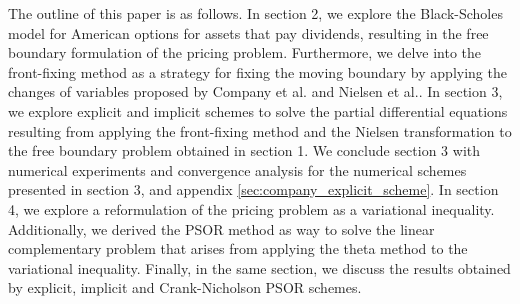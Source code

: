 The outline of this paper is as follows. In section 2, we explore the Black-Scholes model for American options for assets that pay dividends, resulting in the free boundary formulation of the pricing problem. Furthermore, we delve into the front-fixing method as a strategy for fixing the moving boundary by applying the changes of variables proposed by Company et al.\cite{company_egorova_jodar_2014} and Nielsen et al.\cite{nielsen_2001}. In section 3, we explore explicit and implicit schemes to solve the partial differential equations resulting from applying the front-fixing method and the Nielsen transformation to the free boundary problem obtained in section 1. We conclude section 3 with numerical experiments and convergence analysis for the numerical schemes presented in section 3, and appendix \ref{sec:company_explicit_scheme}. In section 4, we explore a reformulation of the pricing problem as a variational inequality. Additionally, we derived the PSOR method as way to solve the linear complementary problem that arises from applying the theta method to the variational inequality. Finally, in the same section, we discuss the results obtained by explicit, implicit and Crank-Nicholson PSOR schemes.

